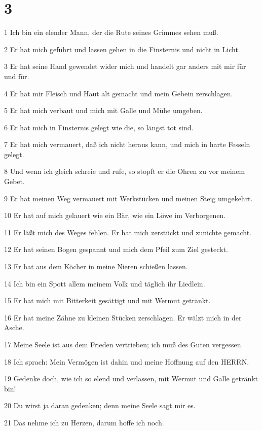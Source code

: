 \chapter{3}

\par 1 Ich bin ein elender Mann, der die Rute seines Grimmes sehen muß.
\par 2 Er hat mich geführt und lassen gehen in die Finsternis und nicht in Licht.
\par 3 Er hat seine Hand gewendet wider mich und handelt gar anders mit mir für und für.
\par 4 Er hat mir Fleisch und Haut alt gemacht und mein Gebein zerschlagen.
\par 5 Er hat mich verbaut und mich mit Galle und Mühe umgeben.
\par 6 Er hat mich in Finsternis gelegt wie die, so längst tot sind.
\par 7 Er hat mich vermauert, daß ich nicht heraus kann, und mich in harte Fesseln gelegt.
\par 8 Und wenn ich gleich schreie und rufe, so stopft er die Ohren zu vor meinem Gebet.
\par 9 Er hat meinen Weg vermauert mit Werkstücken und meinen Steig umgekehrt.
\par 10 Er hat auf mich gelauert wie ein Bär, wie ein Löwe im Verborgenen.
\par 11 Er läßt mich des Weges fehlen. Er hat mich zerstückt und zunichte gemacht.
\par 12 Er hat seinen Bogen gespannt und mich dem Pfeil zum Ziel gesteckt.
\par 13 Er hat aus dem Köcher in meine Nieren schießen lassen.
\par 14 Ich bin ein Spott allem meinem Volk und täglich ihr Liedlein.
\par 15 Er hat mich mit Bitterkeit gesättigt und mit Wermut getränkt.
\par 16 Er hat meine Zähne zu kleinen Stücken zerschlagen. Er wälzt mich in der Asche.
\par 17 Meine Seele ist aus dem Frieden vertrieben; ich muß des Guten vergessen.
\par 18 Ich sprach: Mein Vermögen ist dahin und meine Hoffnung auf den HERRN.
\par 19 Gedenke doch, wie ich so elend und verlassen, mit Wermut und Galle getränkt bin!
\par 20 Du wirst ja daran gedenken; denn meine Seele sagt mir es.
\par 21 Das nehme ich zu Herzen, darum hoffe ich noch.

